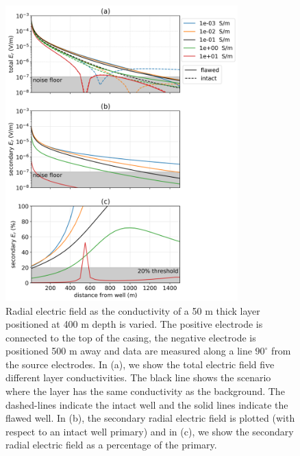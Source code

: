 \begin{figure}
    \begin{center}
    \includegraphics[width=0.8\textwidth]{figures/dc_casing/integrity_layer.png}
    \end{center}
\caption{
    Radial electric field as the conductivity of a 50 m thick layer positioned at 400 m depth is varied.
    The positive electrode is connected to the top of the casing, the negative electrode
    is positioned 500 m away and data are measured along a line $90^\circ$ from the
    source electrodes. In (a), we show the total electric field five different layer conductivities.
    The black line shows the scenario where the layer has the same conductivity as the background.
    The dashed-lines indicate the intact well and the solid lines indicate the flawed well.
    In (b), the secondary radial electric field is plotted (with respect to an intact well primary)
    and in (c), we show the
    secondary radial electric field as a percentage of the primary.
}
\label{fig:integrity_layer}
\end{figure}
